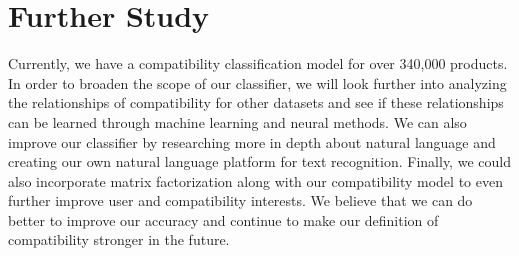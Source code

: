 \section{Further Study}
Currently, we have a compatibility classification model for over 340,000 products. In order to broaden the scope of our classifier, we will look further into analyzing the relationships of compatibility for other datasets and see if these relationships can be learned through machine learning and neural methods. We can also improve our classifier by researching more in depth about natural language and creating our own natural language platform for text recognition. Finally, we could also incorporate matrix factorization along with our compatibility model to even further improve user and compatibility interests. We believe that we can do better to improve our accuracy and continue to make our definition of compatibility stronger in the future. 
